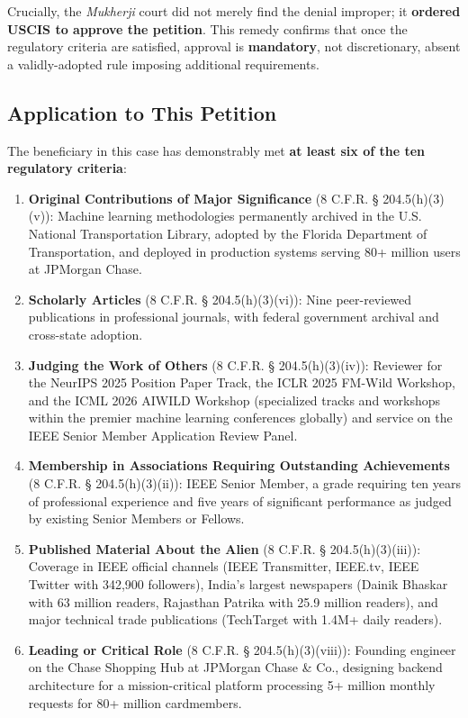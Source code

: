 Crucially, the \textit{Mukherji} court did not merely find the denial improper; it \textbf{ordered USCIS to approve the petition}. This remedy confirms that once the regulatory criteria are satisfied, approval is \textbf{mandatory}, not discretionary, absent a validly-adopted rule imposing additional requirements.

\subsection{Application to This Petition}

The beneficiary in this case has demonstrably met \textbf{at least six of the ten regulatory criteria}:

\begin{enumerate}
    \item \textbf{Original Contributions of Major Significance} (8 C.F.R. § 204.5(h)(3)(v)): Machine learning methodologies permanently archived in the U.S. National Transportation Library, adopted by the Florida Department of Transportation, and deployed in production systems serving 80+ million users at JPMorgan Chase.
    
    \item \textbf{Scholarly Articles} (8 C.F.R. § 204.5(h)(3)(vi)): Nine peer-reviewed publications in professional journals, with federal government archival and cross-state adoption.
    
    \item \textbf{Judging the Work of Others} (8 C.F.R. § 204.5(h)(3)(iv)): Reviewer for the NeurIPS 2025 Position Paper Track, the ICLR 2025 FM-Wild Workshop, and the ICML 2026 AIWILD Workshop (specialized tracks and workshops within the premier machine learning conferences globally) and service on the IEEE Senior Member Application Review Panel.
    
    \item \textbf{Membership in Associations Requiring Outstanding Achievements} (8 C.F.R. § 204.5(h)(3)(ii)): IEEE Senior Member, a grade requiring ten years of professional experience and five years of significant performance as judged by existing Senior Members or Fellows.
    
    \item \textbf{Published Material About the Alien} (8 C.F.R. § 204.5(h)(3)(iii)): Coverage in IEEE official channels (IEEE Transmitter, IEEE.tv, IEEE Twitter with 342,900 followers), India's largest newspapers (Dainik Bhaskar with 63 million readers, Rajasthan Patrika with 25.9 million readers), and major technical trade publications (TechTarget with 1.4M+ daily readers).
    
    \item \textbf{Leading or Critical Role} (8 C.F.R. § 204.5(h)(3)(viii)): Founding engineer on the Chase Shopping Hub at JPMorgan Chase \& Co., designing backend architecture for a mission-critical platform processing 5+ million monthly requests for 80+ million cardmembers.
\end{enumerate}

